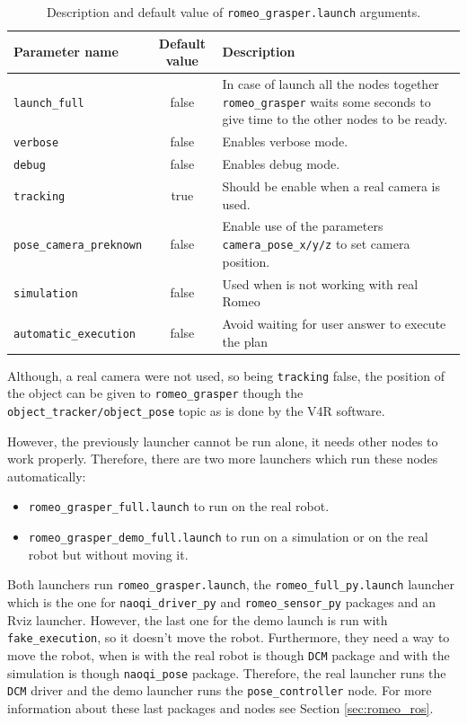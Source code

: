 \documentclass[12pt,a4paper,final,twoside,openright]{report}
\begin{document}
\begin{table}[!h]
\begin{center}
\begin{tabulary}{0.9\textwidth}{|l|c|J|}
\hline
\textbf{Parameter name} & \textbf{Default value} & \textbf{Description} \\ \hline
\texttt{launch\_full} & false & In case of launch all the nodes together \texttt{romeo\_grasper} waits some seconds to give time to the other nodes to be ready.\\ \hline
\texttt{verbose} & false & Enables verbose mode.\\ \hline
\texttt{debug} & false & Enables debug mode.\\ \hline
\texttt{tracking} & true & Should be enable when a real camera is used.\\ \hline
\texttt{pose\_camera\_preknown} & false & Enable use of the parameters \texttt{camera\_pose\_x/y/z} to set camera position.\\ \hline
\texttt{simulation} & false & Used when is not working with real Romeo\\ \hline
\texttt{automatic\_execution} & false & Avoid waiting for user answer to execute the plan\\ \hline
\end{tabulary}
\caption{Description and default value of \texttt{romeo\_grasper.launch} arguments.\label{tab:arg_launch_romeo_grasper}}
\end{center}
\end{table}

Although, a real camera were not used, so being \texttt{tracking} false, the position of the object can be given to \texttt{romeo\_grasper} though the \texttt{object\_tracker/object\_pose} topic as is done by the V4R software.

However, the previously launcher cannot be run alone, it needs other nodes to work properly. Therefore, there are two more launchers which run these nodes automatically: 
\begin{itemize}
\item \texttt{romeo\_grasper\_full.launch} to run on the real robot.
\item \texttt{romeo\_grasper\_demo\_full.launch} to run on a simulation or on the real robot but without moving it.
\end{itemize}

Both launchers run \texttt{romeo\_grasper.launch}, the \texttt{romeo\_full\_py.launch} launcher which is the one for \texttt{naoqi\_driver\_py} and \texttt{romeo\_sensor\_py} packages and an Rviz launcher. However, the last one for the demo launch is run with \texttt{fake\_execution}, so it doesn't move the robot. Furthermore, they need a way to move the robot, when is with the real robot is though \texttt{DCM} package and with the simulation is though \texttt{naoqi\_pose} package. Therefore, the real launcher runs the \texttt{DCM} driver and the demo launcher runs the \texttt{pose\_controller} node. For more information about these last packages and nodes see Section \ref{sec:romeo_ros}.
\end{document}
